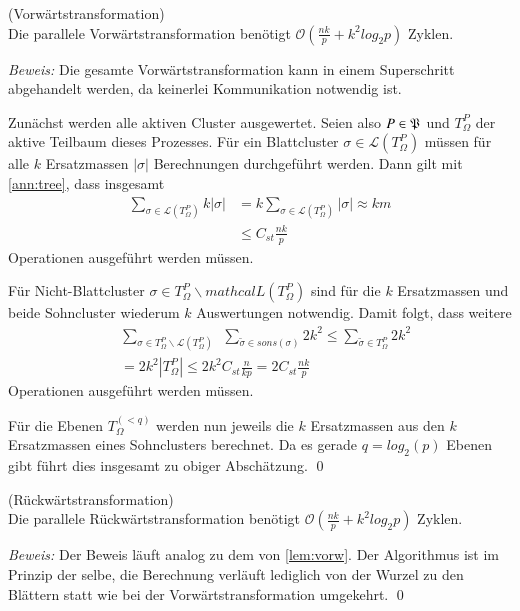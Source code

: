   \begin{lem}
  \label{lem:vorw}
    (Vorwärtstransformation)\\
    Die parallele Vorwärtstransformation benötigt $\mathcal{O}(\frac{nk}{p}+k^2log_2p)$ Zyklen.
  \end{lem}
  
  \textit{Beweis:} 
  Die gesamte Vorwärtstransformation kann in einem Superschritt abgehandelt werden, da keinerlei Kommunikation notwendig ist. 
  
  Zunächst werden alle aktiven Cluster ausgewertet. Seien also $P \in \mathfrak{P}$ und $T_\Omega^P$ der aktive Teilbaum dieses Prozesses. Für ein Blattcluster $\sigma \in \mathcal{L}(T_\Omega^P)$ müssen 
  für alle $k$ Ersatzmassen $|\sigma|$ Berechnungen durchgeführt werden.  
  Dann gilt  mit \autoref{ann:tree}, dass insgesamt
  \begin{align*}
    \sum_{\sigma \in \mathcal{L}(T_\Omega^P)} k|\sigma| &= k\sum_{\sigma \in \mathcal{L}(T_\Omega^P)} |\sigma| \approx k m\\
    &\leq C_{st}\frac{nk}{p}
  \end{align*}
  Operationen ausgeführt werden müssen.
  
  Für Nicht-Blattcluster $\sigma \in T_\Omega^P \backslash mathcal{L}(T_\Omega^P)$ sind für die $k$ Ersatzmassen und beide Sohncluster wiederum $k$ Auswertungen notwendig. Damit folgt, dass weitere
  \begin{align*}
    &\sum_{\sigma \in T_\Omega^P \backslash \mathcal{L}(T_\Omega^P)} \ \ \sum_{\tilde \sigma \in sons(\sigma)} 2k^2 \leq \sum_{\tilde \sigma \in T_\Omega^P} 2k^2\\
    &= 2k^2 |T_\Omega^P| \leq 2k^2 C_{st} \frac{n}{kp} = 2C_{st}\frac{nk}{p}
  \end{align*}
  Operationen ausgeführt werden müssen.
  
  Für die Ebenen $T_\Omega^{(<q)}$ werden nun jeweils die $k$ Ersatzmassen aus den $k$ Ersatzmassen eines Sohnclusters berechnet. Da es gerade $q = log_2(p)$ Ebenen gibt führt dies insgesamt zu obiger
  Abschätzung. \qed
  
  \begin{lem}
  \label{lem:ruckw}
    (Rückwärtstransformation)\\
    Die parallele Rückwärtstransformation benötigt $\mathcal{O}(\frac{nk}{p}+k^2log_2p)$ Zyklen.
  \end{lem}
  
  \textit{Beweis:}
  Der Beweis läuft analog zu dem von \autoref{lem:vorw}. Der Algorithmus ist im Prinzip der selbe, die Berechnung verläuft lediglich von der Wurzel zu den Blättern statt wie bei der 
  Vorwärtstransformation umgekehrt. \qed
  
